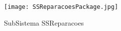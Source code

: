 \documentclass[../../relatorio.tex]{subfiles}
\begin{document}
\begin{figure}[!ht]
    \centering
    \texttt{[image: SSReparacoesPackage.jpg]}
    \caption{SubSistema SSReparacoes}
\end{figure}
\end{document}
